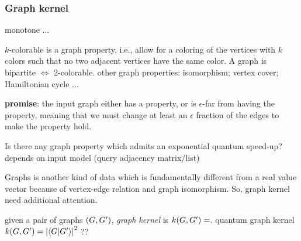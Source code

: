 \subsubsection{Graph kernel}
\begin{definition}\label{def:graph_property}
	monotone ...
\end{definition}
\begin{example}[colorable]\label{exm:colorable}
	$k$-colorable is a graph property, i.e., allow for a coloring of the vertices with $k$ colors such that no two adjacent vertices have the same color.
	A graph is bipartite $\iff$ 2-colorable.
	other graph properties: isomorphism; vertex cover; Hamiltonian cycle ...
\end{example}
\begin{problem}\label{prm:graph_property_test}
	\textbf{promise}: the input graph either has a property, or is $\epsilon$-far from having the property, meaning that we must change at least an $\epsilon$ fraction of the edges to make the property hold.
\end{problem}
\begin{theorem}
\end{theorem}
\begin{question}
	\cite{montanaroSurveyQuantumProperty2018}
	Is there any graph property which admits an exponential quantum speed-up?
	\cite{ben-davidSymmetriesGraphProperties2020}
	depends on input model (query adjacency matrix/list)
\end{question}
Graphs is another kind of data which is fundamentally different from a real value vector because of vertex-edge relation and graph isomorphism.
So, graph kernel \cite{kriegeSurveyGraphKernels2020} need additional attention.
\begin{definition}\label{def:graph_kernel}
	given a pair of graphs $(G,G')$,
	\emph{graph kernel} is $k (G,G')  =$.
	quantum graph kernel $\kernel (\graph,\graph')  = \abs{\ip{\graph}{\graph'}}^2$ ??
	\cite{baiQuantumJensenShannon2015}	
\end{definition}

